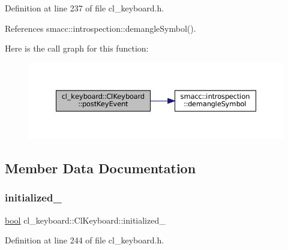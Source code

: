 Definition at line 237 of file cl\+\_\+keyboard.\+h.



References smacc\+::introspection\+::demangle\+Symbol().


Here is the call graph for this function\+:
\nopagebreak
\begin{figure}[H]
\begin{center}
\leavevmode
\includegraphics[width=350pt]{classcl__keyboard_1_1ClKeyboard_ac1311ce9a6a64e590df2e1b088f0e733_cgraph}
\end{center}
\end{figure}


\subsection{Member Data Documentation}
\mbox{\label{classcl__keyboard_1_1ClKeyboard_a96128ed5180e0dc5cfe76c90a9f8e8f7}} 
\subsubsection{\texorpdfstring{initialized\+\_\+}{initialized\_}}
{\footnotesize\ttfamily \hyperlink{classbool}{bool} cl\+\_\+keyboard\+::\+Cl\+Keyboard\+::initialized\+\_\+\hspace{0.3cm}{\ttfamily [private]}}



Definition at line 244 of file cl\+\_\+keyboard.\+h.



